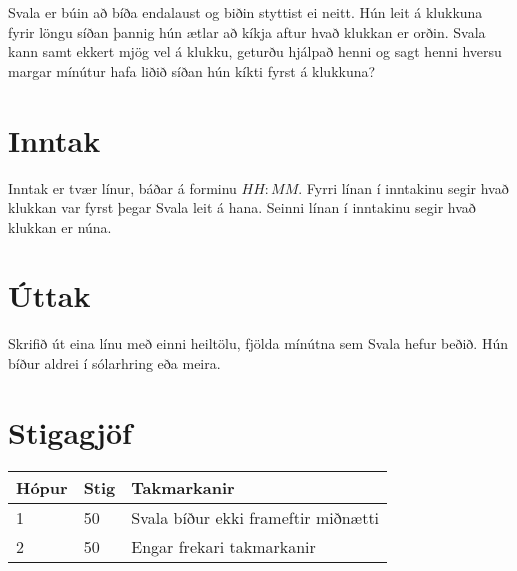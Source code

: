 
Svala er búin að bíða endalaust og biðin styttist ei neitt.
Hún leit á klukkuna fyrir löngu síðan þannig hún ætlar að kíkja aftur
hvað klukkan er orðin.
Svala kann samt ekkert mjög vel á klukku, geturðu hjálpað henni og sagt
henni hversu margar mínútur hafa liðið síðan hún kíkti fyrst á klukkuna?

\section*{Inntak}
Inntak er tvær línur, báðar á forminu $HH:MM$.
Fyrri línan í inntakinu segir hvað klukkan var fyrst þegar Svala leit á hana.
Seinni línan í inntakinu segir hvað klukkan er núna.

\section*{Úttak}
Skrifið út eina línu með einni heiltölu, fjölda mínútna sem Svala hefur beðið.
Hún bíður aldrei í sólarhring eða meira.

\section*{Stigagjöf}
\begin{tabular}{|l|l|l|}
\hline
Hópur & Stig & Takmarkanir \\ \hline
1     & 50   & Svala bíður ekki frameftir miðnætti \\ \hline
2     & 50   & Engar frekari takmarkanir\\ \hline
\end{tabular}
